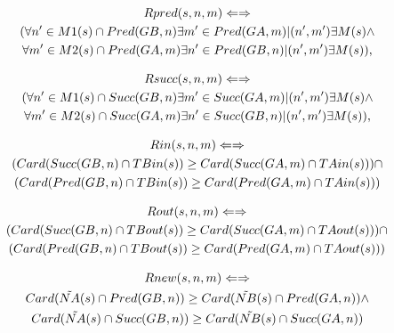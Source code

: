 
\begin{multline}
	Rpred(s,n,m) \Leftarrow \Rightarrow \\(\forall n' \in M1(s) \cap Pred(G{\tiny B},n) \exists m' \in Pred(G{\tiny A},m)| (n',m') \exists M(s) \wedge \\ \forall m' \in M2(s) \cap Pred(G{\tiny A},m) \exists n' \in Pred(G{\tiny B},n)| (n',m') \exists M(s)),
\end{multline} 

\begin{multline}
	Rsucc(s,n,m) \Leftarrow \Rightarrow \\(\forall n' \in M1(s) \cap Succ(G{\tiny B},n) \exists m' \in Succ(G{\tiny A},m)| (n',m') \exists M(s) \wedge \\ \forall m' \in M2(s) \cap Succ(G{\tiny A},m) \exists n' \in Succ(G{\tiny B},n)| (n',m') \exists M(s)),
\end{multline} 

\begin{multline}
	Rin(s,n,m) \Leftarrow \Rightarrow \\ (Card(Succ(G{\tiny B},n) \cap TBin(s)) \geq Card(Succ(G{\tiny A},m) \cap TAin(s))) \cap \\ (Card(Pred(G{\tiny B},n) \cap TBin(s)) \geq Card(Pred(G{\tiny A},m) \cap TAin(s)))
\end{multline}

\begin{multline}
	Rout(s,n,m) \Leftarrow \Rightarrow \\ (Card(Succ(G{\tiny B},n) \cap TBout(s)) \geq Card(Succ(G{\tiny A},m) \cap TAout(s))) \cap \\ (Card(Pred(G{\tiny B},n) \cap TBout(s)) \geq Card(Pred(G{\tiny A},m) \cap TAout(s)))
\end{multline}

\begin{multline}
	Rnew(s,n,m) \Leftarrow \Rightarrow \\ Card(\tilde{NA}(s) \cap Pred(G{\tiny B},n)) \geq Card(\tilde{NB}(s) \cap Pred(G{\tiny A},n)) \wedge \\ Card(\tilde{NA}(s) \cap Succ(G{\tiny B},n)) \geq Card(\tilde{NB}(s) \cap Succ(G{\tiny A},n))
\end{multline}
